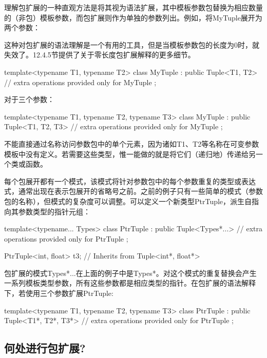 理解包扩展的一种直观方法是将其视为语法扩展，其中模板参数包替换为相应数量的（非包）模板参数，而包扩展则作为单独的参数列出。例如，将MyTuple展开为两个参数：

\begin{notice}
这种对包扩展的语法理解是一个有用的工具，但是当模板参数包的长度为0时，就失效了。12.4.5节提供了关于零长度包扩展解释的更多细节。
\end{notice}

\begin{cpp}
template<typename T1, typename T2>
class MyTuple : public Tuple<T1, T2> {
	// extra operations provided only for MyTuple
};
\end{cpp}

对于三个参数：

\begin{cpp}
template<typename T1, typename T2, typename T3>
class MyTuple : public Tuple<T1, T2, T3> {
	// extra operations provided only for MyTuple
};
\end{cpp}

不能直接通过名称访问参数包中的单个元素，因为诸如T1、T2等名称在可变参数模板中没有定义。若需要这些类型，惟一能做的就是将它们（递归地）传递给另一个类或函数。

每个包展开都有一个模式，该模式将针对参数包中的每个参数重复的类型或表达式，通常出现在表示包展开的省略号之前。之前的例子只有一些简单的模式（参数包的名称），但模式的复杂度可以调整。可以定义一个新类型PtrTuple，派生自指向其参数类型的指针元组：

\begin{cpp}
template<typename... Types>
class PtrTuple : public Tuple<Types*...> {
	// extra operations provided only for PtrTuple
};

PtrTuple<int, float> t3; // Inherits from Tuple<int*, float*>
\end{cpp}

包扩展的模式Types*...在上面的例子中是Types*。对这个模式的重复替换会产生一系列模板类型参数，所有这些参数都是相应类型的指针。在包扩展的语法解释下，若使用三个参数扩展PtrTuple:

\begin{cpp}
template<typename T1, typename T2, typename T3>
class PtrTuple : public Tuple<T1*, T2*, T3*> {
	// extra operations provided only for PtrTuple
};
\end{cpp}

\subsection{何处进行包扩展?}

